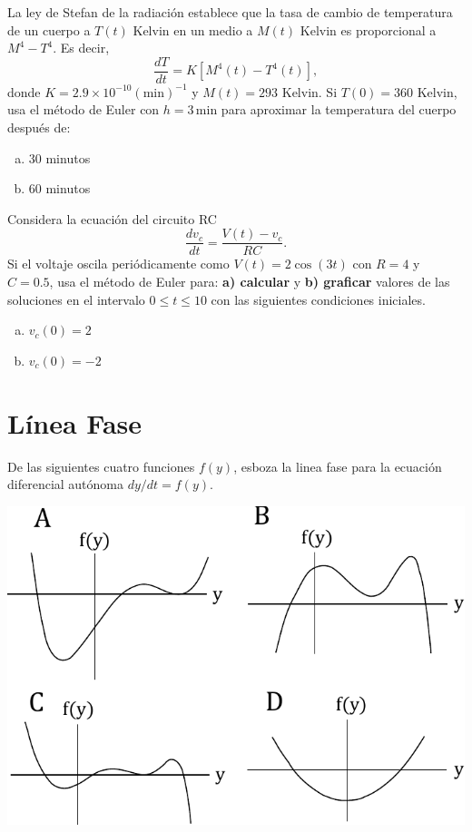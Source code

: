 \documentclass[12pt]{exam}
\begin{document}
\begin{questions}
     \question
     La ley de Stefan de la radiación establece que la tasa de cambio de temperatura de un cuerpo a $T(t)$ Kelvin en un medio a $M(t)$ Kelvin es proporcional a $M^4-T^4$. Es decir, $$\frac{dT}{dt}=K\left[M^4(t)-T^4(t) \right],$$ donde $K=2.9\times10^{-10}(\text{min})^{-1}$ y $M(t)=293$ Kelvin. Si $T(0)=360$ Kelvin, usa el método de Euler con $h=3\,\text{min}$ para aproximar la temperatura del cuerpo después de:
     
     \begin{enumerate}[a)]
         \item 30 minutos
         \item 60 minutos
     \end{enumerate}
     \question
     Considera la ecuación del circuito RC $$\frac{dv_c}{dt}=\frac{V(t)-v_c}{RC}.$$ Si el voltaje oscila periódicamente como $V(t)=2\cos(3t)$ con $R=4$ y $C=0.5$, usa el método de Euler para: \textbf{a) calcular} y \textbf{b) graficar} valores de las soluciones en el intervalo $0\leq t\leq10$ con las siguientes condiciones iniciales.
     
     \begin{enumerate}[a)]
         \item $v_c(0)=2$
         \item $v_c(0)=-2$
     \end{enumerate}

    \section{Línea Fase}

     \question
     De las siguientes cuatro funciones $f(y)$, esboza la linea fase para la ecuación diferencial autónoma $dy/dt=f(y)$.
     \begin{center}
     \includegraphics[scale=.8]{F2T1.pdf}
     \end{center}
     

\end{questions}
\end{document}
